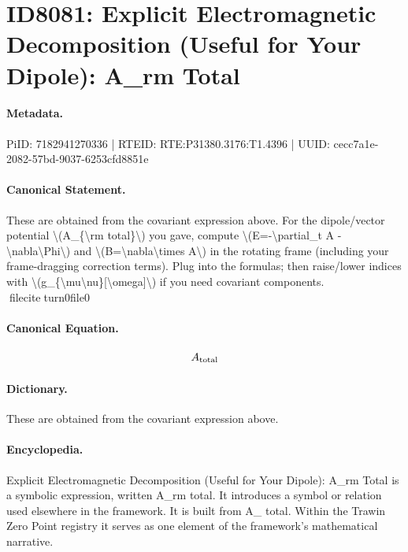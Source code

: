 \section*{ID8081: Explicit Electromagnetic Decomposition (Useful for Your Dipole): A\_rm Total}
\paragraph{Metadata.}
PiID: 7182941270336 | RTEID: RTE:P31380.3176:T1.4396 | UUID: cecc7a1e-2082-57bd-9037-6253cfd8851e

\paragraph{Canonical Statement.}
These are obtained from the covariant expression above. For the dipole/vector potential \textbackslash{}(A\_\{\textbackslash{}rm total\}\textbackslash{}) you gave, compute \textbackslash{}(E=-\textbackslash{}partial\_t A - \textbackslash{}nabla\textbackslash{}Phi\textbackslash{}) and \textbackslash{}(B=\textbackslash{}nabla\textbackslash{}times A\textbackslash{}) in the rotating frame (including your frame-dragging correction terms). Plug into the formulas; then raise/lower indices with \textbackslash{}(g\_\{\textbackslash{}mu\textbackslash{}nu\}[\textbackslash{}omega]\textbackslash{}) if you need covariant components. fileciteturn0file0

\paragraph{Canonical Equation.}
\[
A_{\rm total}
\]

\paragraph{Dictionary.}
These are obtained from the covariant expression above.

\paragraph{Encyclopedia.}
Explicit Electromagnetic Decomposition (Useful for Your Dipole): A\_rm Total is a symbolic expression, written A\_rm total. It introduces a symbol or relation used elsewhere in the framework. It is built from A\_ total. Within the Trawin Zero Point registry it serves as one element of the framework's mathematical narrative.
